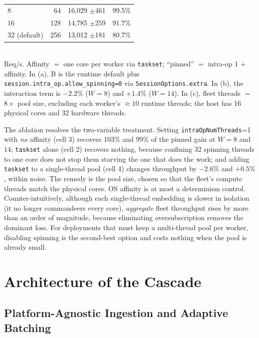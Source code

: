 \documentclass[conference]{IEEEtran}
\begin{document}
\begin{table}[t]
\begin{tabular}{@{}lrrr@{}}
8 & 64 & 16{,}029 $\pm$461 & 99.5\% \\
16 & 128 & 14{,}785 $\pm$259 & 91.7\% \\
32 (default) & 256 & 13{,}012 $\pm$181 & 80.7\% \\
\bottomrule
\end{tabular}
\\[2pt]\footnotesize Req/s. Affinity $=$ one core per worker via \texttt{taskset}; ``pinned'' $=$ intra-op 1 $+$ affinity. In (a), B is the runtime default plus \texttt{session.intra\_op.allow\_spinning=0} via \texttt{SessionOptions.extra}. In (b), the interaction term is $-2.2\%$ ($W{=}8$) and $+1.4\%$ ($W{=}14$). In (c), fleet threads $=$ $8\times$ pool size, excluding each worker's ${\approx}10$ runtime threads; the host has 16 physical cores and 32 hardware threads.
\end{table}

The ablation resolves the two-variable treatment. Setting \texttt{intraOpNumThreads}=1 with \emph{no} affinity (cell 3) recovers 103\% and 99\% of the pinned gain at $W{=}8$ and $14$; \texttt{taskset} alone (cell 2) recovers nothing, because confining 32 spinning threads to one core does not stop them starving the one that does the work; and adding \texttt{taskset} to a single-thread pool (cell 4) changes throughput by $-2.6\%$ and $+0.5\%$, within noise. The remedy is the pool size, chosen so that the fleet's compute threads match the physical cores. OS affinity is at most a determinism control. Counter-intuitively, although each single-thread embedding is slower in isolation (it no longer commandeers every core), \emph{aggregate} fleet throughput rises by more than an order of magnitude, because eliminating oversubscription removes the dominant loss. For deployments that must keep a multi-thread pool per worker, disabling spinning is the second-best option and costs nothing when the pool is already small.

\section{Architecture of the Cascade}

\subsection{Platform-Agnostic Ingestion and Adaptive Batching}
\end{document}
